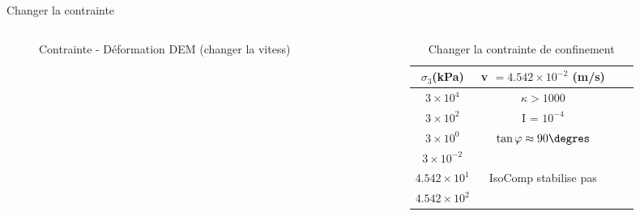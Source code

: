 \documentclass[10pt]{beamer}
\begin{document}
\begin{frame}{Changer la contrainte}
    \begin{columns}
        \begin{column}{0.5\textwidth}
            \begin{figure}[h]
                \centering
                \scalebox{0.5}{}
                \caption{Contrainte - Déformation DEM (changer la vitess)}
            \end{figure}
        \end{column}
        \begin{column}{0.5\textwidth}
            \begin{table}
                \centering
                \begin{tabular}{|c|c|c|c|}
                    \hline
                    $\sigma_{3} $(kPa)      & v $ = 4.542   \times 10^{-2}$ (m/s)                  \\
                    \hline
                    $3 \times 10^4$         & $\kappa > 1000$                                      \\
                    \hline
                    $3 \times 10^2$         & I = $10^{-4}$                                        \\
                    \hline
                    \rowcolor{white}
                    $3 \times 10^0$         & \multirow{2}{*}{$\tan {\varphi} \approx 90 \degres$} \\
                    \cline{1-1}
                    $3 \times 10^{-2}$      &                                                      \\
                    \hline

                    $4.542   \times 10^{1}$ & \multirow{2}{*}{IsoComp stabilise pas}               \\
                    \cline{1-1}
                    $4.542   \times 10^{2}$ &                                                      \\
                    \hline
                \end{tabular}
                \caption{Changer la contrainte de confinement}
            \end{table}
        \end{column}
    \end{columns}
\end{frame}
\end{document}
